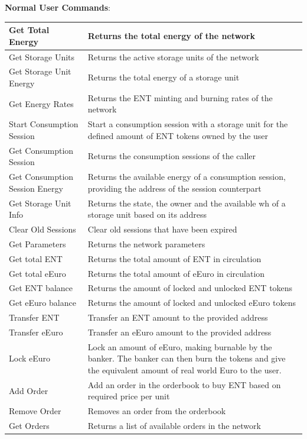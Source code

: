 \textbf{Normal User Commands}:
\begin{longtable}{|p{5.5cm}|p{8cm}|}
    \hline
    Get Total Energy & Returns the total energy of the network \\ \hline
    Get Storage Units & Returns the active storage units of the network \\ \hline
    Get Storage Unit Energy & Returns the total energy of a storage unit \\ \hline
    Get Energy Rates & Returns the ENT minting and burning rates of the network \\ \hline
    Start Consumption Session & Start a consumption session with a storage unit for the defined amount of ENT tokens owned by the user \\ \hline
    Get Consumption Session & Returns the consumption sessions of the caller \\ \hline
    Get Consumption Session Energy & Returns the available energy of a consumption session, providing the address of the session counterpart \\ \hline
    Get Storage Unit Info & Returns the state, the owner and the available wh of a storage unit based on its address \\ \hline
    Clear Old Sessions & Clear old sessions that have been expired \\ \hline
    Get Parameters & Returns the network parameters \\ \hline
    Get total ENT & Returns the total amount of ENT in circulation \\ \hline 
    Get total eEuro & Returns the total amount of eEuro in circulation \\ \hline
    Get ENT balance & Returns the amount of locked and unlocked ENT tokens \\ \hline
    Get eEuro balance & Returns the amount of locked and unlocked eEuro tokens \\ \hline
    Transfer ENT & Transfer an ENT amount to the provided address \\ \hline
    Transfer eEuro & Transfer an eEuro amount to the provided address \\ \hline
    Lock eEuro & Lock an amount of eEuro, making burnable by the banker. The banker can then burn the tokens and give the equivalent amount of real world Euro to the user. \\ \hline
    Add Order & Add an order in the orderbook to buy ENT based on required price per unit \\ \hline
    Remove Order & Removes an order from the orderbook \\ \hline
    Get Orders & Returns a list of available orders in the network \\ \hline
\end{longtable}

